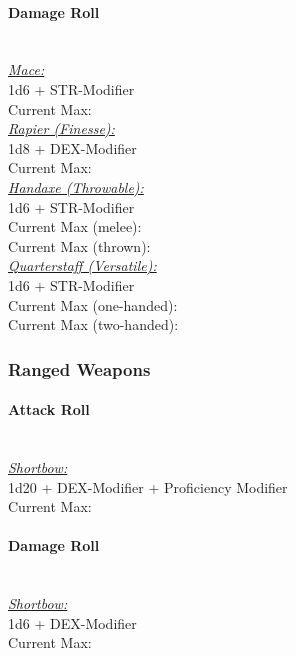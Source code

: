 \documentclass[letterpaper,openany,oneside,twocolumn]{book}
\begin{document}
\paragraph*{Damage Roll}\hfill\\
\underline{\textit{Mace:}}\\
1d6 + STR-Modifier\\
\indent Current Max: 
\\
\underline{\textit{Rapier (Finesse):}}\\
1d8 + DEX-Modifier\\
\indent Current Max: 
\\
\underline{\textit{Handaxe (Throwable):}}\\
1d6 + STR-Modifier\\
\indent Current Max (melee): \\
\indent Current Max (thrown): 
\\
\underline{\textit{Quarterstaff (Versatile):}}\\
1d6 + STR-Modifier\\
\indent Current Max (one-handed): \\
\indent Current Max (two-handed): 
\subsubsection*{Ranged Weapons}
\paragraph*{Attack Roll}\hfill\\
\underline{\textit{Shortbow:}}\\
1d20 + DEX-Modifier + Proficiency Modifier\\
\indent Current Max: 
\paragraph*{Damage Roll}\hfill\\
\underline{\textit{Shortbow:}}\\
1d6 + DEX-Modifier\\
\indent Current Max: 
\end{document}
